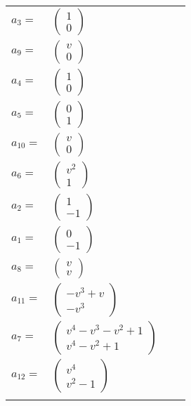 \documentclass[1p]{elsarticle_modified}
\theoremstyle{definition}
\begin{document}
\begin{tabular}{m{7pt} m{180pt} m{7pt} m{180pt} }
\flushright $a_{3}=$&$\begin{pmatrix}1\\0\end{pmatrix}$ \\
\flushright $a_{9}=$&$\begin{pmatrix}v\\0\end{pmatrix}$ \\
\flushright $a_{4}=$&$\begin{pmatrix}1\\0\end{pmatrix}$ \\
\flushright $a_{5}=$&$\begin{pmatrix}0\\1\end{pmatrix}$ \\
\flushright $a_{10}=$&$\begin{pmatrix}v\\0\end{pmatrix}$ \\
\flushright $a_{6}=$&$\begin{pmatrix}v^2\\1\end{pmatrix}$ \\
\flushright $a_{2}=$&$\begin{pmatrix}1\\-1\end{pmatrix}$ \\
\flushright $a_{1}=$&$\begin{pmatrix}0\\-1\end{pmatrix}$ \\
\flushright $a_{8}=$&$\begin{pmatrix}v\\v\end{pmatrix}$ \\
\flushright $a_{11}=$&$\begin{pmatrix}- v^3+v\\- v^3\end{pmatrix}$ \\
\flushright $a_{7}=$&$\begin{pmatrix}v^4- v^3- v^2+1\\v^4- v^2+1\end{pmatrix}$ \\
\flushright $a_{12}=$&$\begin{pmatrix}v^4\\v^2-1\end{pmatrix}$\\&\end{tabular}
\end{document}
